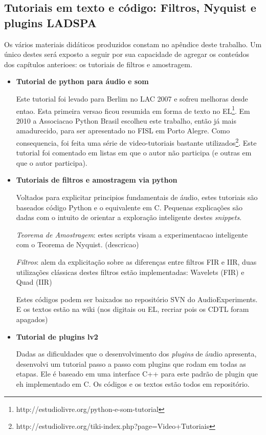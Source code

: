   \subsection{Tutoriais em texto e código: Filtros, Nyquist e plugins LADSPA}

Os vários materiais didáticos produzidos constam no apêndice
deste trabalho. Um único destes será exposto a seguir por sua
capacidade de agregar os conteúdos dos capítulos anterioes:
os tutoriais de filtros e amostragem.

\begin{itemize}
    \item {\bf Tutorial de python para áudio e som}

Este tutorial foi levado para Berlim no LAC 2007 e sofreu melhoras desde entao. Esta
primeira versao ficou resumida em forma de texto no EL\footnote{http://estudiolivre.org/python-e-som-tutorial}. Em 2010
a Associacao Python Brasil escolheu este trabalho, então já mais amadurecido, para ser apresentado no
FISL em Porto Alegre. Como consequencia, foi feita uma série de video-tutoriais bastante utilizados\footnote{http://estudiolivre.org/tiki-index.php?page=Video+Tutoriais}.
Este tutorial foi comentado em listas em que o autor não participa (e outras em que o autor participa).

    \item {\bf Tutoriais de filtros e amostragem via python}

Voltados para explicitar principios fundamentais de áudio, estes tutoriais
são baseados código Python e o equivalente em C. Pequenas explicações são
dadas com o intuito de orientar a exploração inteligente destes \emph{snippets}.

\emph{Teorema de Amostragem}: estes scripts visam a experimentacao inteligente com
o Teorema de Nyquist. (descricao)

\emph{Filtros}: alem da explicitação sobre as diferenças entre filtros FIR e IIR,
duas utilizações clássicas destes filtros estão implementadas: Wavelets (FIR) e Quad (IIR)

Estes códigos podem ser baixados no repositório SVN do AudioExperiments. E os textos estão
na wiki (nos digitais ou EL, recriar pois os CDTL foram apagados)

    \item {\bf Tutorial de plugins lv2}

Dadas as dificuldades que o desenvolvimento dos \emph{plugins} de áudio apresenta,
desenvolvi um tutorial passo a passo com plugins que rodam em todas as etapas.
Ele é baseado em uma interface C++ para este padrão de plugin que eh implementado
em C. Os códigos e os textos estão todos em repositório.


\end{itemize}
